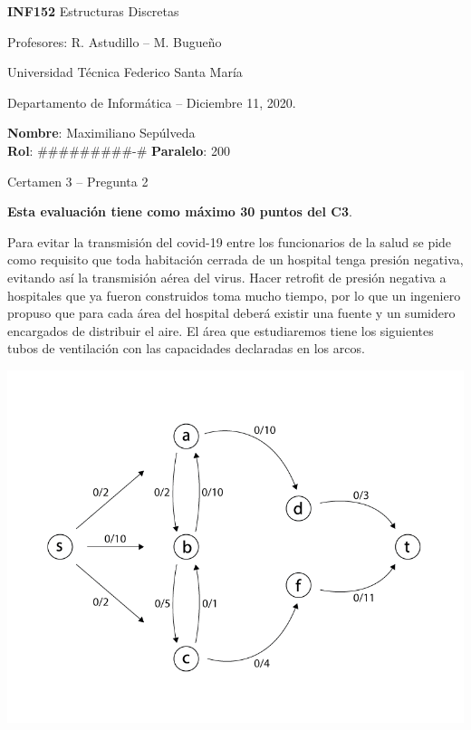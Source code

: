\documentclass[10pt]{article}
\begin{document}
\thispagestyle{empty}

\begin{minipage}[t]{0.6\textwidth}

{\LARGE \textbf{INF152} Estructuras Discretas}

{\large Profesores: R. Astudillo -- M. Bugueño}

Universidad Técnica Federico Santa María

Departamento de Informática -- Diciembre 11, 2020.

\end{minipage}
\hfill
\begin{minipage}[t]{0.35\textwidth}
\textbf{Nombre}: Maximiliano Sepúlveda\\[0.3cm]
\textbf{Rol}: #########-# \textbf{Paralelo}: 200
\end{minipage}

\vspace{0.8cm}

{\Large Certamen 3 -- Pregunta 2}

\vspace{0.4cm}

\textbf{Esta evaluación tiene como máximo 30 puntos del C3}.

\noindent Para evitar la transmisión del covid-19 entre los funcionarios de la salud se pide como requisito que toda habitación cerrada de un hospital
tenga presión negativa, evitando así la transmisión aérea del virus. Hacer retrofit de presión negativa a hospitales que ya fueron construidos toma mucho tiempo, por lo que un ingeniero propuso que para cada área del hospital deberá existir una fuente y un sumidero encargados de distribuir el aire. El área que estudiaremos tiene los siguientes tubos de ventilación con las capacidades declaradas en los arcos.
\begin{center}
  \includegraphics[scale=0.5]{BASE.png}
\end{center}
\end{document}
